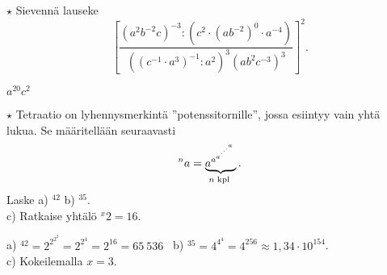 \begin{tehtavasivu}
\begin{tehtava}
\end{tehtava}

\begin{tehtava}
  		$\star$ Sievennä lauseke
$$\left[ \frac{(a^2b^{-2}c)^{-3}:\left(c^2\cdot (ab^{-2})^0 \cdot a^{-4}\right)}
{\left((c^{-1}\cdot a^3)^{-1}:a^2\right)^3(ab^2c^{-3})^3} \right]^2.$$
\begin{vastaus}
$a^20c^2$
\end{vastaus}
\end{tehtava} 
 
\begin{tehtava}
$\star$ Tetraatio on lyhennysmerkintä ''potenssitornille'',
jossa esiintyy vain yhtä lukua. Se määritellään seuraavasti
\[^na = \underbrace{{a^{a^{a^{\mathstrut^{.^{.^{.^{a}}}}}}}}}_{n\textrm{ kpl }}. \]
Laske \quad a) $^42$  \quad b) $^35$. \\ c) Ratkaise yhtälö $^x2= 16$.
\begin{vastaus}
a) $^42 = 2^{2^{2^2}}=2^{2^4}=2^{16}=65\ 536$ \
b) $^35 = 4^{4^4} = 4^{256} \approx 1,34 \cdot 10^{154}$. \\
c) Kokeilemalla $x =3$.
\end{vastaus}
\end{tehtava}

\end{tehtavasivu}
